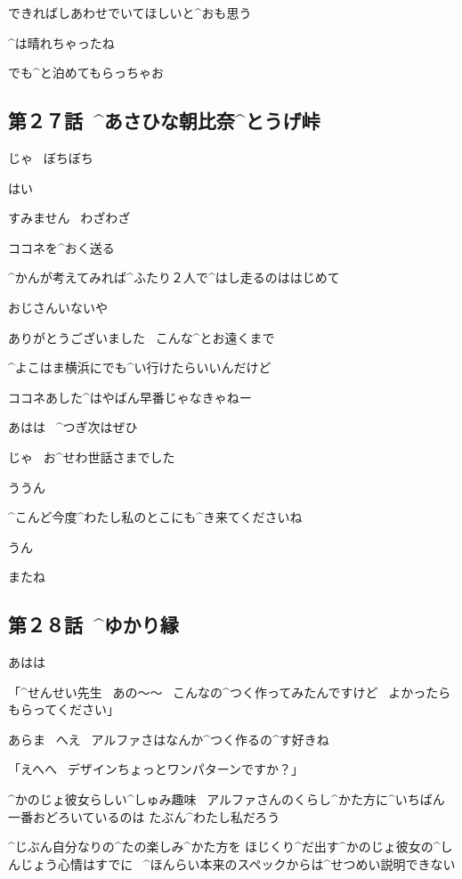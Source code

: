 \ASevenMOne できればしあわせでいてほしいと^{おも}{思}う

\page[52]
\Alpha ^{は}{晴}れちゃったね

\Kokone でも^{と}{泊}めてもらっちゃお


\subsection{第２７話\ ^{あさひな}{朝比奈}^{とうげ}{峠}}

\page[55]
\Alpha じゃ
\ ぼちぼち

\Kokone はい

\Kokone すみません
\ わざわざ

\Alpha ココネを^{おく}{送}る

\Alpha ^{かんが}{考}えてみれば^{ふたり}{２人}で^{はし}{走}るのははじめて

\page
\Alpha おじさんいないや

\page
\Kokone ありがとうございました
\ こんな^{とお}{遠}くまで

\Alpha ^{よこはま}{横浜}にでも^{い}{行}けたらいいんだけど

\Alpha ココネあした^{はやばん}{早番}じゃなきゃねー

\Kokone あはは
\ ^{つぎ}{次}はぜひ

\Kokone じゃ
\ お^{せわ}{世話}さまでした

\Alpha ううん

\page
\Kokone ^{こんど}{今度}^{わたし}{私}のとこにも^{き}{来}てくださいね

\Alpha うん

\page[60]
 またね


\subsection{第２８話\ ^{ゆかり}{縁}}

\page[62]
\Alpha あはは

\Alpha 「^{せんせい}{先生}
\ あの〜〜
\ こんなの^{つく}{作}ってみたんですけど
\ よかったらもらってください」

\Sensei あらま
\ へえ
\ アルファさはなんか^{つく}{作}るの^{す}{好}きね

\Alpha 「えへへ
\ デザインちょっとワンパターンですか？」

\page
\Sensei ^{かのじょ}{彼女}らしい^{しゅみ}{趣味}
\ アルファさんのくらし^{かた}{方}に^{いちばん}{一番}おどろいているのは
たぶん^{わたし}{私}だろう

\Sensei ^{じぶん}{自分}なりの^{たの}{楽}しみ^{かた}{方}を
ほじくり^{だ}{出}す^{かのじょ}{彼女}の^{しんじょう}{心情}はすでに
\ ^{ほんらい}{本来}のスペックからは^{せつめい}{説明}できない

